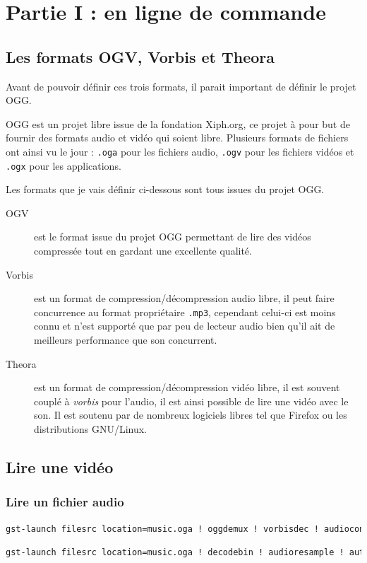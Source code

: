 \documentclass[a4paper, 11pt]{article}
\begin{document}
	\maketitle
	\section{Partie I : en ligne de commande}
	\subsection{Les formats OGV, Vorbis et Theora}
	Avant de pouvoir définir ces trois formats, il parait important de définir le projet OGG.

	OGG est un projet libre issue de la fondation Xiph.org, ce projet à pour but de fournir des formats audio et vidéo qui soient libre. Plusieurs formats de
	fichiers ont ainsi vu le jour : \texttt{.oga} pour les fichiers audio, \texttt{.ogv} pour les fichiers vidéos et \texttt{.ogx} pour les applications.
	
	Les formats que je vais définir ci-dessous sont tous issues du projet OGG.
	\begin{description}
		\item[OGV] est le format issue du projet OGG permettant de lire des vidéos compressée tout en gardant une excellente qualité.
		\item[Vorbis] est un format de compression/décompression audio libre, il peut faire concurrence au format propriétaire \texttt{.mp3}, cependant celui-ci est
			moins connu et n'est supporté que par peu de lecteur audio bien qu'il ait de meilleurs performance que son concurrent.
		\item[Theora] est un format de compression/décompression vidéo libre, il est souvent couplé à \textit{vorbis} pour l'audio, il est ainsi possible de lire une
			vidéo avec le son. Il est soutenu par de nombreux logiciels libres tel que Firefox ou les distributions GNU/Linux. 
	\end{description}
	\subsection{Lire une vidéo}
	\subsubsection{Lire un fichier audio}
	\begin{lstlisting}[numbers=none,language=sh, caption=Lire un fichier audio -- Uniquement pour les fichier \texttt{.oga}]
gst-launch filesrc location=music.oga ! oggdemux ! vorbisdec ! audioconvert ! alsasink
	\end{lstlisting}
	\begin{lstlisting}[numbers=none,language=sh, caption=Lire un fichier audio -- Pour tous les formats audio]
gst-launch filesrc location=music.oga ! decodebin ! audioresample ! autoaudiosink
	\end{lstlisting}
\end{document}
